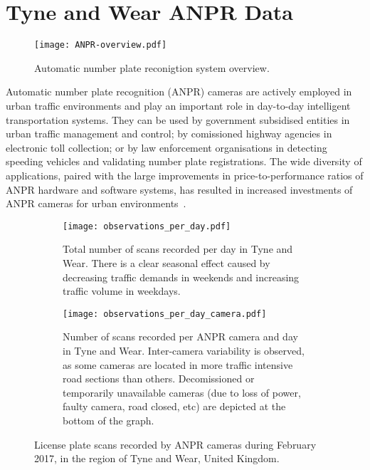 \section{Tyne and Wear ANPR Data}\label{s.ncl}

\begin{figure}[t]
\centering
\texttt{[image: ANPR-overview.pdf]}
\caption{Automatic number plate reconigtion system overview.}
\label{fig:anpr-overview}
\end{figure}

Automatic number plate recognition (ANPR) cameras are actively employed in urban traffic environments and play an important role in day-to-day intelligent transportation systems. They can be used by government subsidised entities in urban traffic management and control; by comissioned highway agencies in electronic toll collection; or by law enforcement organisations in detecting speeding vehicles and validating number plate registrations. The wide diversity of applications, paired with the large improvements in price-to-performance ratios of ANPR hardware and software systems, has resulted in increased investments of ANPR cameras for urban environments~\cite{EvolutionUTMC2013, SurveyITS2011}.

\begin{figure*}[t]
\centering
\begin{subfigure}[t]{.48\textwidth}
  \centering
  \texttt{[image: observations\_per\_day.pdf]}
  \caption{Total number of scans recorded per day in Tyne and Wear. There is a clear seasonal effect caused by decreasing traffic demands in weekends and increasing traffic volume in weekdays.}
  \label{fig:observations-per-day}
\end{subfigure}\hfill
\begin{subfigure}[t]{.48\textwidth}
  \centering
  \texttt{[image: observations\_per\_day\_camera.pdf]}
  \caption{Number of scans recorded per ANPR camera and day in Tyne and Wear. Inter-camera variability is observed, as some cameras are located in more traffic intensive road sections than others. Decomissioned or temporarily unavailable cameras (due to loss of power, faulty camera, road closed, etc) are depicted at the bottom of the graph.}
  \label{fig:observations-per-camera-day}
\end{subfigure}
\caption{License plate scans recorded by ANPR cameras during February 2017, in the region of Tyne and Wear, United Kingdom.}
\label{fig:time-series}
\end{figure*}

